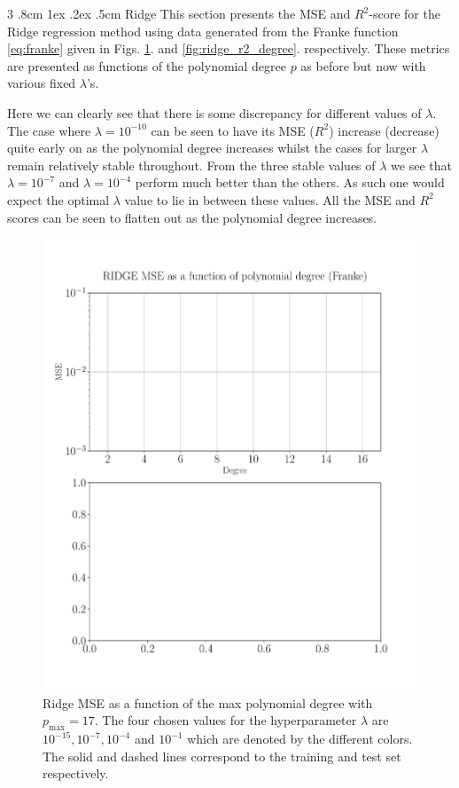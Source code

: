 \documentclass[%
reprint,
amsmath,amssymb,
aps,
pra,
]{revtex4-2}
\makeatletter
\renewcommand{\subsubsection}{%
	\@startsection
	{subsubsection}%
	{3}%
	{\z@}%
	{.8cm \@plus1ex \@minus .2ex}%
	{.5cm}%
	{\normalfont\small\centering}%
}
\makeatother
\begin{document}
\subsubsection{Ridge}
This section presents the MSE and \(R^2\)-score for the Ridge regression method using data generated from the Franke function \eqref{eq:franke} given in Figs. \ref{fig:ridge_mse_degree}. and \ref{fig:ridge_r2_degree}. respectively. These metrics are presented as functions of the polynomial degree \(p\) as before but now with various fixed \(\lambda \)'s. 

Here we can clearly see that there is some discrepancy for different values of $\lambda$. The case where $\lambda=10^{-10}$ can be seen to have its MSE ($R^2$) increase (decrease) quite early on as the polynomial degree increases whilst the cases for larger $\lambda$ remain relatively stable throughout. From the three stable values of $\lambda$ we see that $\lambda=10^{-7}$ and $\lambda=10^{-4}$ perform much better than the others. As such one would expect the optimal $\lambda$ value to lie in between these values. All the MSE and $R^2$ scores can be seen to flatten out as the polynomial degree increases. 
\begin{figure}[ht!]
	\centering
	\includegraphics[width=\linewidth]{Python/Figures/Ridge/RIDGE_MSE_Unscaled.pdf}
	\caption{Ridge MSE as a function of the max polynomial degree with \(p_{\text{max}}=17\). The four chosen values for the hyperparameter $\lambda$ are $10^{-15},10^{-7},10^{-4}$ and $10^{-1}$ which are denoted by the different colors. The solid and dashed lines correspond to the training and test set respectively.}
	\label{fig:ridge_mse_degree}
\end{figure}
\end{document}

